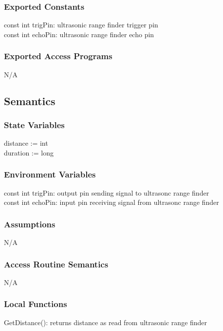 \documentclass[12pt, titlepage]{article}
\begin{document}
\subsubsection{Exported Constants}
const int trigPin: ultrasonic range finder trigger pin\\
const int echoPin: ultrasonic range finder echo pin\\
\subsubsection{Exported Access Programs}

N/A

\subsection{Semantics}

\subsubsection{State Variables}

distance := int\\
duration := long\\
\subsubsection{Environment Variables}

const int trigPin: output pin sending signal to ultrasonc range finder\\
const int echoPin: input pin receiving signal from ultrasonc range finder\\

\subsubsection{Assumptions}

N/A

\subsubsection{Access Routine Semantics}

N/A

\subsubsection{Local Functions}

GetDistance(): returns distance as read from ultrasonic range finder
\end{document}

